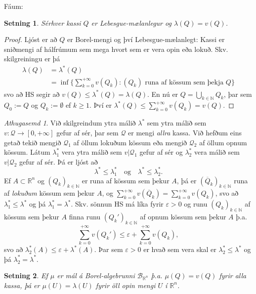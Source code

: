 \documentclass[a4paper,icelandic,11pt]{book}
\theoremstyle{plain}      \newtheorem{setn}{Setning}[chapter]
\theoremstyle{definition} \newtheorem{skilgr}[setn]{Skilgreining}
\theoremstyle{remark}     \newtheorem*{ath}{Athugasemd}
\newcommand{\R}{\mathbb R}
\newcommand{\N}{\mathbb N}
\begin{document}
Fáum:
\begin{setn}
  Sérhver kassi $Q$ er Lebesgue-mælanlegur og $\lambda(Q)=v(Q)$.
\end{setn}
\begin{proof}
  Ljóst er að $Q$ er Borel-mengi og því Lebesgue-mælanlegt: Kassi er
  sniðmengi af hálfrúmum sem mega hvort sem er vera opin eða
  lokuð. Skv. skilgreiningu er þá
  \begin{align*}
    \lambda(Q)
    &= \lambda^{*}(Q)
    \\
    &= \inf\{\sum_{k=0}^{+\infty}v(Q_{k}) : (Q_{k})\text{ runa af
      kössum sem þekja }Q \}
  \end{align*}
  svo að HS segir að $v(Q)\le\lambda^{*}(Q)=\lambda(Q)$. En nú er
  $Q=\bigcup_{k\in\N}Q_{k}$, þar sem $Q_{0}:=Q$ og $Q_{k}:=\emptyset$
  ef $k\ge 1$. Því er $\lambda^{*}(Q)\le\sum_{k=0}^{+\infty}v(Q_{k})=v(Q)$.
\end{proof}
\begin{ath}
  Við skilgreindum ytra málið $\lambda^{*}$ sem ytra málið sem
  $v:\mathcal{Q}\to\left[0,+\infty\right]$ gefur af sér, þar sem
  $\mathcal{Q}$ er mengi \emph{allra} kassa. Við hefðum eins getað
  tekið mengið $\mathcal{Q}_{1}$ af öllum lokuðum kössum eða mengið
  $\mathcal{Q}_{2}$ af öllum opnum kössum. Látum $\lambda_{1}^{*}$
  vera ytra málið sem $v|\mathcal{Q}_{1}$ gefur af sér og
  $\lambda_{2}^{*}$ vera málið sem $v|\mathcal{Q}_{2}$ gefur af
  sér. Þá er ljóst að
  \[
  \lambda^{*}\le\lambda_{1}^{*}
  \quad\text{og}\quad
  \lambda^{*}\le\lambda_{2}^{*}.
  \]
  Ef $A\subset\R^{n}$ og $(Q_{k})_{k\in\N}$ er runa af kössum sem
  þekur $A$, þá er $(\overline Q_{k})_{k\in\N}$ runa af \emph{lokuðum}
  kössum sem þekur $A$, og
  $\sum_{k=0}^{+\infty}v(\overline{Q}_{k})=\sum_{k=0}^{+\infty}v(Q_{k})$,
  svo að $\lambda_{1}^{*}\le\lambda^{*}$ og þá
  $\lambda_{1}^{*}=\lambda^{*}$. Skv. sönnun HS má líka fyrir
  $\varepsilon>0$ og runu $(Q_{k})_{k\in\N}$ af kössum sem þekur $A$
  finna runu $(Q_{k}')_{k\in\N}$ af opnum kössum sem þekur $A$ þ.a.
  \[
  \sum_{k=0}^{+\infty}v(Q_{k}')
  \le \varepsilon + \sum_{k=0}^{+\infty}v(Q_{k}),
  \]
  svo að $\lambda_{2}^{*}(A)\le\varepsilon+\lambda^{*}(A)$. Þar sem
  $\varepsilon>0$ er hvað sem vera skal er
  $\lambda_{2}^{*}\le\lambda^{*}$ og þá $\lambda_{2}^{*}=\lambda^{*}$.
\end{ath}
\begin{setn}
  Ef $\mu$ er mál á Borel-algebrunni $\mathcal{B}_{\R^{n}}$
  þ.a. $\mu(Q)=v(Q)$ fyrir alla kassa, þá er $\mu(U)=\lambda(U)$ fyrir
  öll opin mengi $U$ í $\mathbb R^{n}$.
\end{setn}
\end{document}
